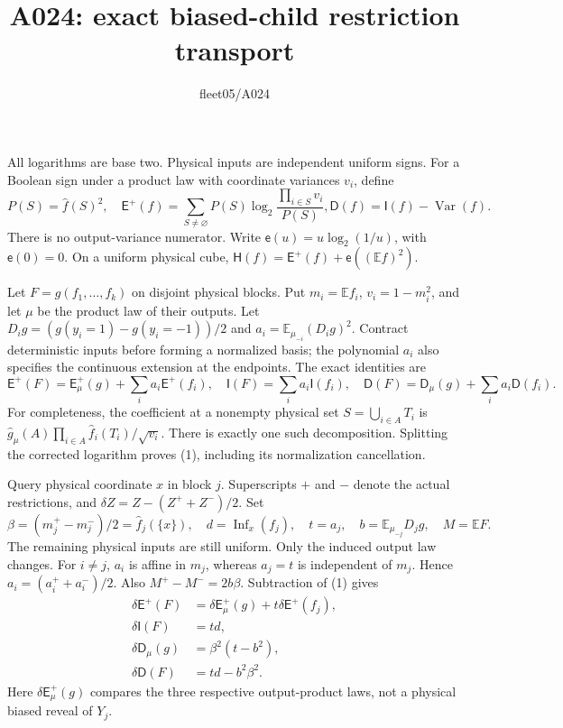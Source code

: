 \documentclass{article}
\newcommand{\HH}{\mathsf H}
\newcommand{\EE}{\mathsf E^+}
\newcommand{\II}{\mathsf I}
\newcommand{\DD}{\mathsf D}
\newcommand{\de}{\delta}
\newcommand{\eb}{\mathsf e}
\begin{document}
\title{A024: exact biased-child restriction transport}
\author{fleet05/A024}\maketitle
All logarithms are base two. Physical inputs are independent uniform signs.
For a Boolean sign under a product law with coordinate variances $v_i$, define
\[
 P(S)=\widehat f(S)^2,\quad
 \EE(f)=\sum_{S\ne\varnothing}P(S)\log_2\frac{\prod_{i\in S}v_i}{P(S)},
 \DD(f)=\II(f)-\operatorname{Var}(f).
\]
There is no output-variance numerator. Write $\eb(u)=u\log_2(1/u)$,
with $\eb(0)=0$. On a uniform physical cube,
$\HH(f)=\EE(f)+\eb((\mathbb Ef)^2)$.

Let $F=g(f_1,\ldots,f_k)$ on disjoint physical blocks. Put
$m_i=\mathbb Ef_i$, $v_i=1-m_i^2$, and let $\mu$ be the product law
of their outputs. Let $D_i g=(g(y_i=1)-g(y_i=-1))/2$ and
$a_i=\mathbb E_{\mu_{-i}}(D_i g)^2$. Contract deterministic inputs
before forming a normalized basis; the polynomial $a_i$ also specifies
the continuous extension at the endpoints. The exact identities are
\[
 \EE(F)=\EE_\mu(g)+\sum_i a_i\EE(f_i),\quad
 \II(F)=\sum_i a_i\II(f_i),\quad
 \DD(F)=\DD_\mu(g)+\sum_i a_i\DD(f_i).
\tag{1}
\]
For completeness, the coefficient at a nonempty physical set
$S=\bigcup_{i\in A}T_i$ is
$\widehat g_\mu(A)\prod_{i\in A}\widehat f_i(T_i)/\sqrt{v_i}$.
There is exactly one such decomposition. Splitting the corrected
logarithm proves (1), including its normalization cancellation.

Query physical coordinate $x$ in block $j$. Superscripts $+$ and $-$
denote the actual restrictions, and $\de Z=Z-(Z^++Z^-)/2$.
Set
\[
 \beta=(m_j^+-m_j^-)/2=\widehat f_j(\{x\}),\quad
 d=\operatorname{Inf}_x(f_j),\quad
 t=a_j,\quad b=\mathbb E_{\mu_{-j}}D_jg,\quad M=\mathbb EF.
\]
The remaining physical inputs are still uniform. Only the induced output
law changes. For $i\ne j$, $a_i$ is affine in $m_j$, whereas $a_j=t$
is independent of $m_j$. Hence $a_i=(a_i^++a_i^-)/2$. Also
$M^+-M^-=2b\beta$. Subtraction of (1) gives
\begin{align}
 \de\EE(F)&=\de\EE_\mu(g)+t\de\EE(f_j),\\
 \de\II(F)&=td,\\
 \de\DD_\mu(g)&=\beta^2(t-b^2),\\
 \de\DD(F)&=td-b^2\beta^2.
\tag{2}
\end{align}
Here $\de\EE_\mu(g)$ compares the three respective output-product laws,
not a physical biased reveal of $Y_j$.
\end{document}

